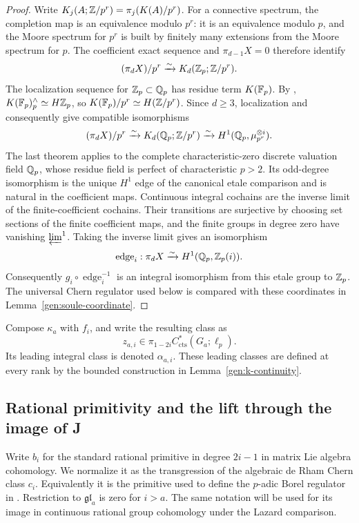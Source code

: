 \begin{proof}
Write $K_j(A;\mathbb Z/p^r)=\pi_j(K(A)/p^r)$.  For a connective spectrum,
the completion map is an equivalence modulo $p^r$: it is an
equivalence modulo $p$, and the Moore spectrum for $p^r$ is built by
finitely many extensions from the Moore spectrum for $p$.  The
coefficient exact sequence and $\pi_{d-1}X=0$ therefore identify
\[
 (\pi_dX)/p^r\xrightarrow{\sim}K_d(\mathbb Z_p;\mathbb Z/p^r).
\]
The localization sequence for $\mathbb Z_p\subset\mathbb Q_p$ has residue term
$K(\mathbb F_p)$.  By \cite[Theorem~B and the following paragraph]
{HesselholtMadsenWitt}, $K(\mathbb F_p)^\wedge_p\simeq H\mathbb Z_p$, so
$K(\mathbb F_p)/p^r\simeq H(\mathbb Z/p^r)$.  Since $d\geq3$, localization and
\cite[Theorem~A, the descent spectral sequence~(6.1.9), and
Theorem~6.1.10]{HesselholtMadsenLocalFields} consequently give
compatible isomorphisms
\[
 (\pi_dX)/p^r
 \xrightarrow{\sim}K_d(\mathbb Q_p;\mathbb Z/p^r)
 \xrightarrow{\sim}H^1(\mathbb Q_p,\mu_{p^r}^{\otimes i}).
\]
The last theorem applies to the complete characteristic-zero
discrete valuation field $\mathbb Q_p$, whose residue field is perfect of
characteristic $p>2$.  Its odd-degree isomorphism is the unique
$H^1$ edge of the canonical etale comparison and is natural in the
coefficient maps.  Continuous integral cochains are the inverse limit
of the finite-coefficient cochains.  Their transitions are surjective
by choosing set sections of the finite coefficient maps, and the
finite groups in degree zero have vanishing $\varprojlim^1$.
Taking the inverse limit gives an isomorphism
\[
 \operatorname{edge}_i:\pi_dX\xrightarrow{\sim}
 H^1(\mathbb Q_p,\mathbb Z_p(i)).
\]
Consequently $g_i\circ\operatorname{edge}_i^{-1}$ is an integral
isomorphism from this etale group to $\mathbb Z_p$.  The universal Chern
regulator used below is compared with these coordinates in
Lemma~\ref{gen:soule-coordinate}.
\end{proof}

Compose $\kappa_a$ with $f_i$, and write the resulting class as
\begin{equation}\label{gen:ell-class}
 z_{a,i}\in
 \pi_{1-2i}C^*_{\mathrm{cts}}(G_a;\ell_p).
\end{equation}
Its leading integral class is denoted $\alpha_{a,i}$.  These leading
classes are defined at every rank by the bounded construction in
Lemma~\ref{gen:k-continuity}.

\subsection{Rational primitivity and the lift through the image of J}
\label{gen:sphere-lifts-section}

Write $b_i$ for the standard rational primitive in degree $2i-1$ in
matrix Lie algebra cohomology.  We normalize it as the transgression
of the algebraic de Rham Chern class $c_i$.  Equivalently it is the
primitive used to define the $p$-adic Borel regulator in
\cite[Definition~0.4.5 and Remark~0.4.6]{HuberKings}.  Restriction to
$\mathfrak{gl}_a$ is zero for $i>a$.  The same notation will be used
for its image in continuous rational group cohomology under the
Lazard comparison.

